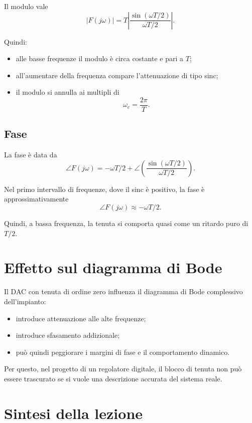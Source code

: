 Il modulo vale
\[
|F(j\omega)|=T\left|\frac{\sin(\omega T/2)}{\omega T/2}\right|.
\]

Quindi:
\begin{itemize}
    \item alle basse frequenze il modulo è circa costante e pari a \(T\);
    \item all'aumentare della frequenza compare l'attenuazione di tipo sinc;
    \item il modulo si annulla ai multipli di
    \[
    \omega_c=\frac{2\pi}{T}.
    \]
\end{itemize}

\subsection{Fase}

La fase è data da
\[
\angle F(j\omega)
=
-\omega T/2
+
\angle\!\left(\frac{\sin(\omega T/2)}{\omega T/2}\right).
\]

Nel primo intervallo di frequenze, dove il sinc è positivo,
la fase è approssimativamente
\[
\angle F(j\omega)\approx -\omega T/2.
\]

Quindi, a bassa frequenza, la tenuta si comporta quasi come un ritardo puro di \(T/2\).

\section{Effetto sul diagramma di Bode}

Il DAC con tenuta di ordine zero influenza il diagramma di Bode complessivo dell'impianto:
\begin{itemize}
    \item introduce attenuazione alle alte frequenze;
    \item introduce sfasamento addizionale;
    \item può quindi peggiorare i margini di fase e il comportamento dinamico.
\end{itemize}

Per questo, nel progetto di un regolatore digitale, il blocco di tenuta
non può essere trascurato se si vuole una descrizione accurata del sistema reale.

\section{Sintesi della lezione}

